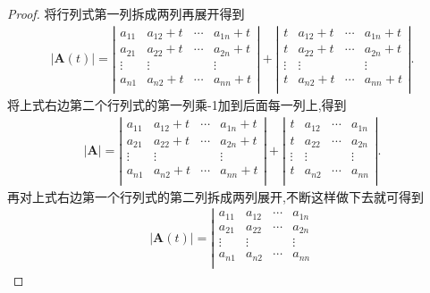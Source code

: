 \documentclass[../../main.tex]{subfiles}%
\begin{document}
\begin{proof}
将行列式第一列拆成两列再展开得到
\begin{align*}
|\boldsymbol{A}(t)|=\left| \begin{matrix}
a_{11}&		a_{12}+t&		\cdots&		a_{1n}+t\\
a_{21}&		a_{22}+t&		\cdots&		a_{2n}+t\\
\vdots&		\vdots&		&		\vdots\\
a_{n1}&		a_{n2}+t&		\cdots&		a_{nn}+t\\
\end{matrix} \right|+\left| \begin{matrix}
t&		a_{12}+t&		\cdots&		a_{1n}+t\\
t&		a_{22}+t&		\cdots&		a_{2n}+t\\
\vdots&		\vdots&		&		\vdots\\
t&		a_{n2}+t&		\cdots&		a_{nn}+t\\
\end{matrix} \right|.
\nonumber
\end{align*}
将上式右边第二个行列式的第一列乘-1加到后面每一列上,得到
\begin{align*}
\left| \boldsymbol{A} \right|=\left| \begin{matrix}
a_{11}&		a_{12}+t&		\cdots&		a_{1n}+t\\
a_{21}&		a_{22}+t&		\cdots&		a_{2n}+t\\
\vdots&		\vdots&		&		\vdots\\
a_{n1}&		a_{n2}+t&		\cdots&		a_{nn}+t\\
\end{matrix} \right|+\left| \begin{matrix}
t&		a_{12}&		\cdots&		a_{1n}\\
t&		a_{22}&		\cdots&		a_{2n}\\
\vdots&		\vdots&		&		\vdots\\
t&		a_{n2}&		\cdots&		a_{nn}\\
\end{matrix} \right| .
\nonumber
\end{align*}
再对上式右边第一个行列式的第二列拆成两列展开,不断这样做下去就可得到
\begin{gather*}
|\boldsymbol{A}(t)|=\left| \begin{matrix}
a_{11}&		a_{12}&		\cdots&		a_{1n}\\
a_{21}&		a_{22}&		\cdots&		a_{2n}\\
\vdots&		\vdots&		&		\vdots\\
a_{n1}&		a_{n2}&		\cdots&		a_{nn}\\

\end{matrix}
\end{gather*}
\end{proof}
\end{document}
